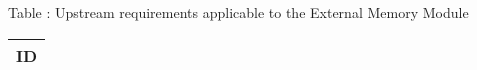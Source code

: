 {
  \vspace{0.5em}
  \begin{center}
    Table \thetable: Upstream requirements applicable to the External Memory Module\label{tab:emm-upstream-requirements}
  \end{center}

\footnotesize
\begin{xltabular}{0.9\textwidth}{|X|}
  \hline
  \textbf{ID} \\
  \hline
\end{xltabular}
}

